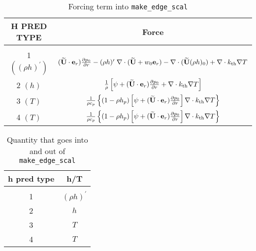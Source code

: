 \documentclass[11pt]{article}
\def\ut    {\widetilde{\bf U}}
\def\er    {{\bf e}_r}
\def\kth   {k_\mathrm{th}}
\begin{document}
\begin{table*}[h]
\begin{center}
\caption{Forcing term into {\tt make\_edge\_scal} \newline}
\begin{tabular}{c|c}
\hline
\hline
{H PRED TYPE} &   {Force} \\
\hline \\[-3mm]
1  $((\rho h)^\prime)$ &  $(\ut \cdot \er) \frac{\partial p_0}{\partial r} - 
 (\rho h)^\prime \; \nabla \cdot (\ut+w_0 \er) - 
 \nabla \cdot (\ut (\rho h)_0) + \nabla \cdot \kth \nabla T$ \\[2 mm]
2  $(h)$ & $\frac{1}{\rho} \left [\psi + (\ut \cdot \er)
  \frac{\partial p_0}{\partial r} + \nabla \cdot \kth \nabla T \right ]$ \\[2 mm]
3  $(T)$ & $\frac{1}{\rho c_p} \left \{ (1 - \rho h_p) 
   \left [\psi + (\ut \cdot \er) \frac{\partial p_0}{\partial r} \right ] \nabla \cdot \kth \nabla T \right \}$ \\[2 mm]
4  $(T)$ & $\frac{1}{\rho c_p} \left\{ (1 - \rho h_p) \left [\psi + (\ut \cdot \er)
\frac{\partial p_0}{\partial r}\right ] \nabla \cdot \kth \nabla T \right\}$ \\[2 mm]
\hline
\end{tabular}
\end{center}
\end{table*}

\begin{table*}[h]
\begin{center}
\caption{Quantity that goes into and out of {\tt make\_edge\_scal} \newline}
\begin{tabular}{c|c}
\hline
\hline
{h pred type} & {h/T } \\
\hline \\[-3mm]
1 & $(\rho h)^\prime$ \\
2 & $h$  \\
3 & $T$  \\
4 & $T$  \\
\hline
\end{tabular}
\end{center}
\end{table*}
\end{document}
